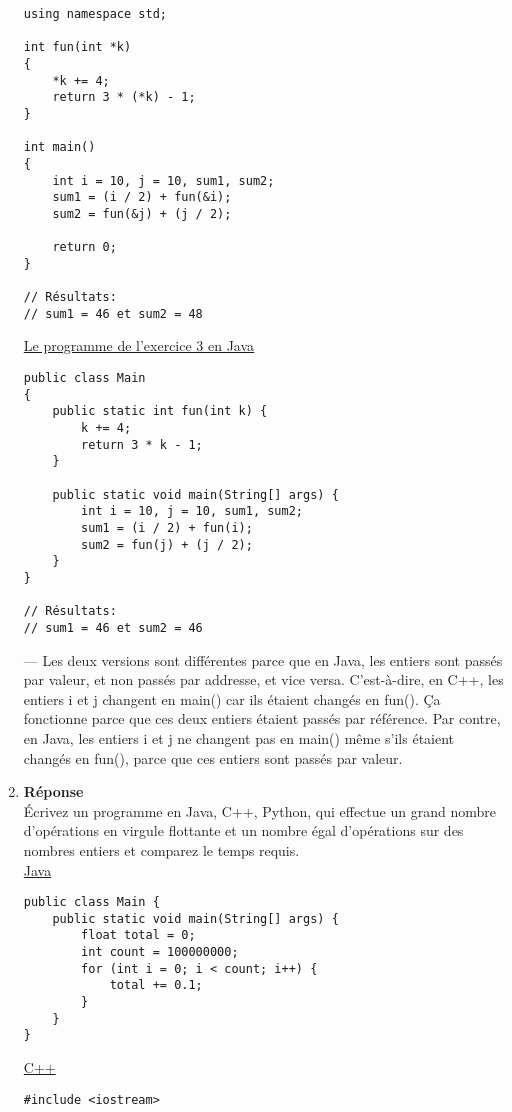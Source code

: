 \documentclass[12pt]{book}
\begin{document}
\begin{enumerate}
\begin{verbatim}
using namespace std;

int fun(int *k)
{
    *k += 4;
    return 3 * (*k) - 1;
}

int main()
{
    int i = 10, j = 10, sum1, sum2;
    sum1 = (i / 2) + fun(&i);
    sum2 = fun(&j) + (j / 2);
    
    return 0;
}

// Résultats:
// sum1 = 46 et sum2 = 48
\end{verbatim}
\underline{Le programme de l'exercice 3 en Java}
\begin{verbatim}
public class Main
{
    public static int fun(int k) {
        k += 4;
        return 3 * k - 1;
    }
    
    public static void main(String[] args) {
        int i = 10, j = 10, sum1, sum2;
        sum1 = (i / 2) + fun(i);
        sum2 = fun(j) + (j / 2);
    }
}

// Résultats:
// sum1 = 46 et sum2 = 46 
\end{verbatim}
--- Les deux versions sont différentes parce que en Java, les entiers sont passés par valeur, et non passés par addresse, et vice versa. C'est-à-dire, en C++, les entiers i et j changent en main() car ils étaient changés en fun(). Ça fonctionne parce que ces deux entiers étaient passés par référence. Par contre, en Java, les entiers i et j ne changent pas en main() même s'ils étaient changés en fun(), parce que ces entiers sont passés par valeur.


\newpage
    \item \textbf{Réponse}\\
    
    Écrivez un programme en Java, C++, Python, qui effectue un grand nombre d'opérations en virgule flottante et un nombre égal d'opérations sur des nombres entiers et comparez le temps requis.\\

\underline{Java}
\begin{verbatim}
public class Main {
    public static void main(String[] args) {
        float total = 0;
        int count = 100000000;
        for (int i = 0; i < count; i++) { 
            total += 0.1; 
        } 
    }
}
\end{verbatim}

\underline{C++}
\begin{verbatim}
#include <iostream>


\end{verbatim}
\end{enumerate}
\end{document}
